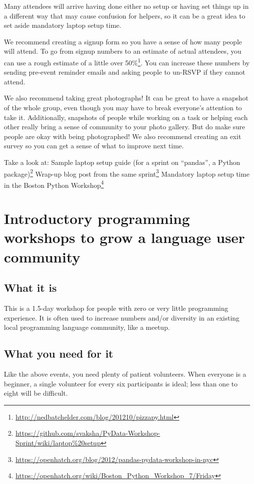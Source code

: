 Many attendees will arrive having done either no setup or having set things up in a different way that may cause confusion for helpers, so it can be a great idea to set aside mandatory laptop setup time.

We recommend creating a signup form so you have a sense of how many people will attend. To go from signup numbers to an estimate of actual attendees, you can use a rough estimate of a little over 50\%\footnote{\url{http://nedbatchelder.com/blog/201210/pizzapy.html}}. You can increase these numbers by sending pre-event reminder emails and asking people to un-RSVP if they cannot attend.

We also recommend taking great photographs! It can be great to have a snapshot of the whole group, even though you may have to break everyone’s attention to take it. Additionally, snapshots of people while working on a task or helping each other really bring a sense of community to your photo gallery. But do make sure people are okay with being photographed! We also recommend creating an exit survey so you can get a sense of what to improve next time.

Take a look at:
Sample laptop setup guide (for a sprint on “pandas”, a Python package)\footnote{\url{https://github.com/svaksha/PyData-Workshop-Sprint/wiki/laptop\%20setup}}
Wrap-up blog post from the same sprint\footnote{\url{https://openhatch.org/blog/2012/pandas-pydata-workshop-in-nyc}}
Mandatory laptop setup time in the Boston Python Workshop\footnote{\url{https://openhatch.org/wiki/Boston_Python_Workshop_7/Friday}}

\section{Introductory programming workshops to grow a language user community}
\subsection{What it is}
This is a 1.5-day workshop for people with zero or very little programming experience. It is often used to increase numbers and/or diversity in an existing local programming language community, like a meetup. 

\subsection{What you need for it}
Like the above events, you need plenty of patient volunteers. When everyone is a beginner, a single volunteer for every six participants is ideal; less than one to eight will be difficult. 

